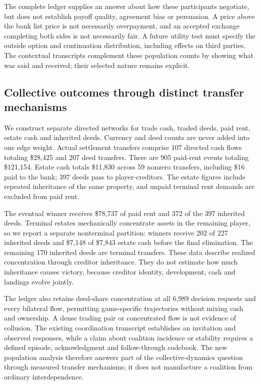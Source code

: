 The complete ledger supplies an answer about how these participants negotiate,
but does not establish payoff quality, agreement bias or persuasion. A price
above the bank list price is not necessarily overpayment, and an accepted
exchange completing both sides is not necessarily fair. A future utility test
must specify the outside option and continuation distribution, including effects
on third parties. The contextual transcripts complement these population counts
by showing what was said and received; their selected nature remains explicit.

\subsection{Collective outcomes through distinct transfer mechanisms}
\label{sec:agenda-collective-flows}

We construct separate directed networks for trade cash, traded deeds, paid
rent, estate cash and inherited deeds. Currency and deed counts are never
added into one edge weight. Actual settlement transfers comprise 107 directed
cash flows totaling \$28,425 and 207 deed transfers. There are 905 paid-rent
events totaling \$121,154. Estate cash totals \$11,830 across 59 nonzero
transfers, including \$16 paid to the bank; 397 deeds pass to player-creditors.
The estate figures include repeated inheritance of the same property, and
unpaid terminal rent demands are excluded from paid rent.

The eventual winner receives \$78,737 of paid rent and 372 of the 397 inherited
deeds. Terminal estates mechanically concentrate assets in the remaining
player, so we report a separate nonterminal partition: winners receive 202 of
227 inherited deeds and \$7,148 of \$7,843 estate cash before the final
elimination. The remaining 170 inherited deeds are terminal transfers. These
data describe realized concentration through creditor inheritance. They do not
estimate how much inheritance causes victory, because creditor identity,
development, cash and landings evolve jointly.

The ledger also retains deed-share concentration at all 6,989 decision requests
and every bilateral flow, permitting game-specific trajectories without mixing
cash and ownership. A dense trading pair or concentrated flow is not evidence
of collusion. The existing coordination transcript establishes an invitation
and observed responses, while a claim about coalition incidence or stability
requires a defined episode, acknowledgment and follow-through codebook. The
new population analysis therefore answers part of the collective-dynamics
question through measured transfer mechanisms; it does not manufacture a
coalition from ordinary interdependence.
